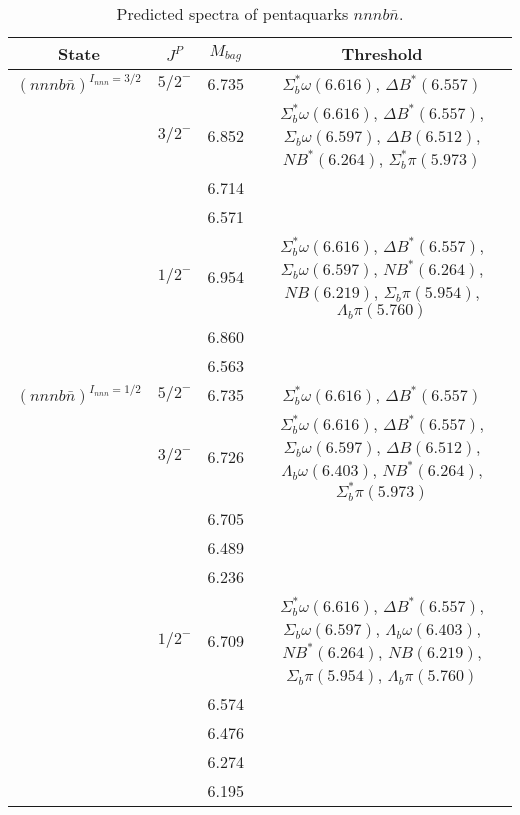 \documentclass[prd,twocolumn,floatfix,nofootinbib]{revtex4}
\begin{document}
\renewcommand{\tabcolsep}{0.5cm}
\renewcommand{\arraystretch}{1.2}
\begin{table*}[!htbp]
    \caption{Predicted spectra of pentaquarks $nnnb\bar{n}$.}
    \begin{tabular}{cccc}
        \hline\hline
        {\rm State} &$J^{P}$ &$M_{bag}$ &Threshold \\ \hline
        ${(nnnb\bar{n})}^{I_{nnn}=3/2}$
            &${5/2}^{-}$    &6.735  &$\Sigma_{b}^{\ast}\omega(6.616)$, $\Delta B^{\ast}(6.557)$ \\
            &${3/2}^{-}$    &6.852  &$\Sigma_{b}^{\ast}\omega(6.616)$, $\Delta B^{\ast}(6.557)$, $\Sigma_{b}\omega(6.597)$, $\Delta B(6.512)$, $NB^{\ast}(6.264)$, $\Sigma_{b}^{\ast}\pi(5.973)$ \\
            &               &6.714  & \\
            &               &6.571  & \\
            &${1/2}^{-}$    &6.954  &$\Sigma_{b}^{\ast}\omega(6.616)$, $\Delta B^{\ast}(6.557)$, $\Sigma_{b}\omega(6.597)$, $NB^{\ast}(6.264)$, $NB(6.219)$, $\Sigma_{b}\pi(5.954)$, $\Lambda_{b}\pi(5.760)$ \\
            &               &6.860  & \\
            &               &6.563  & \\
        ${(nnnb\bar{n})}^{I_{nnn}=1/2}$
            &${5/2}^{-}$    &6.735  &$\Sigma_{b}^{\ast}\omega(6.616)$, $\Delta B^{\ast}(6.557)$ \\
            &${3/2}^{-}$    &6.726  &$\Sigma_{b}^{\ast}\omega(6.616)$, $\Delta B^{\ast}(6.557)$, $\Sigma_{b}\omega(6.597)$, $\Delta B(6.512)$, $\Lambda_{b}\omega(6.403)$, $NB^{\ast}(6.264)$, $\Sigma_{b}^{\ast}\pi(5.973)$ \\
            &               &6.705  & \\
            &               &6.489  & \\
            &               &6.236  & \\
            &${1/2}^{-}$    &6.709  &$\Sigma_{b}^{\ast}\omega(6.616)$, $\Delta B^{\ast}(6.557)$, $\Sigma_{b}\omega(6.597)$, $\Lambda_{b}\omega(6.403)$, $NB^{\ast}(6.264)$, $NB(6.219)$, $\Sigma_{b}\pi(5.954)$, $\Lambda_{b}\pi(5.760)$ \\
            &               &6.574  & \\
            &               &6.476  & \\
            &               &6.274  & \\
            &               &6.195  & \\
        \hline\hline
    \end{tabular}
\end{table*}
\end{document}
